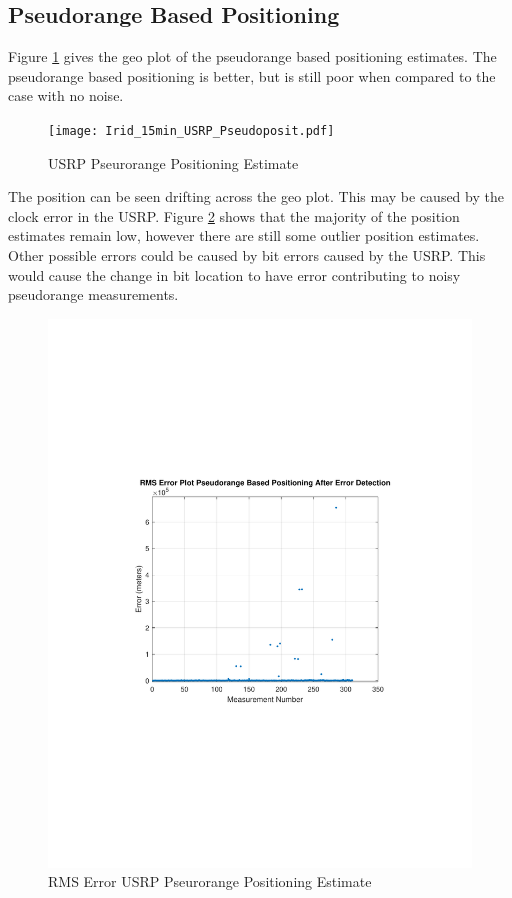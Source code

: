 \documentclass[12pt]{report}
\begin{document}
\subsection{Pseudorange Based Positioning}
Figure \ref{fig:USRPpseudo15minIridPosit} gives the geo plot of the pseudorange based positioning estimates. The pseudorange based positioning is better, but is still poor when compared to the case with no noise. 
\begin{figure}[h!]
    \centering
    \texttt{[image: Irid\_15min\_USRP\_Pseudoposit.pdf]}
    \caption{USRP Pseurorange Positioning Estimate}
    \label{fig:USRPpseudo15minIridPosit}
\end{figure}
The position can be seen drifting across the geo plot. This may be caused by the clock error in the USRP. Figure \ref{fig:USRPpseudo15minIridRMSE} shows that the majority of the position estimates remain low, however there are still some outlier position estimates. Other possible errors could be caused by bit errors caused by the USRP. This would cause the change in bit location to have error contributing to noisy pseudorange measurements. 
\begin{figure}[h!]
    \centering
    \includegraphics[trim=1.2in 3.3in 1.6in 2.9in,clip,width=5in]
    {Irid_15min_USRP_PseudoRMS.pdf}
    \caption{RMS Error USRP Pseurorange Positioning Estimate}
    \label{fig:USRPpseudo15minIridRMSE}
\end{figure}
\end{document}
